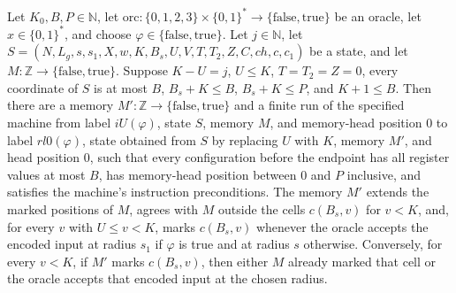 \begin{theorem}
\label{Complexity.LogProg.ExpBFS.ini_run}
\leanok
{}
Let $K_0,B,P\in\mathbb N$, let
$\mathrm{orc}:\{0,1,2,3\}\times\{0,1\}^*\to\{\mathrm{false},\mathrm{true}\}$ be an
oracle, let $x\in\{0,1\}^*$, and choose $\varphi\in\{\mathrm{false},\mathrm{true}\}$.
Let $j\in\mathbb N$, let $S=(N,L_g,s,s_1,X,w,K,B_s,U,V,T,T_2,Z,C,ch,c,c_1)$ be a state,
and let $M:\mathbb Z\to\{\mathrm{false},\mathrm{true}\}$. Suppose $K-U=j$, $U\le K$,
$T=T_2=Z=0$, every coordinate of $S$ is at most $B$, $B_s+K\le B$, $B_s+K\le P$, and
$K+1\le B$. Then there are a memory $M':\mathbb Z\to\{\mathrm{false},\mathrm{true}\}$
and a finite run of the specified machine from label $iU(\varphi)$, state $S$, memory
$M$, and memory-head position $0$ to label $rl0(\varphi)$, state obtained from $S$ by
replacing $U$ with $K$, memory $M'$, and head position $0$, such that every
configuration before the endpoint has all register values at most $B$, has memory-head
position between $0$ and $P$ inclusive, and satisfies the machine's instruction
preconditions. The memory $M'$ extends the marked positions of $M$, agrees with $M$
outside the cells $c(B_s,v)$ for $v<K$, and, for every $v$ with $U\le v<K$, marks
$c(B_s,v)$ whenever the oracle accepts the encoded input at radius $s_1$ if $\varphi$ is
true and at radius $s$ otherwise. Conversely, for every $v<K$, if $M'$ marks $c(B_s,v)$,
then either $M$ already marked that cell or the oracle accepts that encoded input at the
chosen radius.
\end{theorem}


